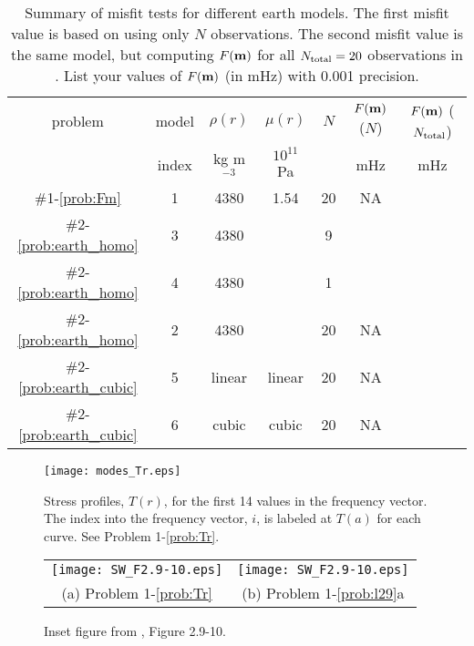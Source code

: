 \documentclass[11pt,titlepage,fleqn]{article}
\begin{document}
\begin{table}
\centering
\caption[]
{{
Summary of misfit tests for different earth models.
The first misfit value is based on using only $N$ observations.
The second misfit value is the same model, but computing $F(\mbox{${\bf m}$})$ for all $N_{\rm total}=20$ observations in .
List your values of $F(\mbox{${\bf m}$})$ (in mHz) with 0.001 precision.
\label{tab:homo}
}}
\begin{spacing}{1.5}
\begin{tabular}{||c|c|c|c|c|c||c|}
\hline
problem & model & $\rho(r)$ & $\mu(r)$ & $N$ & $F(\mbox{${\bf m}$})$ ($N$) & $F(\mbox{${\bf m}$})$ ($N_{\rm total}$) \\
& index & kg m$^{-3}$ & $10^{11}$ Pa & & mHz & mHz \\ \hline\hline
$\#$1-\ref{prob:Fm} & 1 & 4380 & 1.54 & 20 & NA &  \\  \hline
$\#$2-\ref{prob:earth_homo} & 3 & 4380 &      & 9  &  &  \\  \hline
$\#$2-\ref{prob:earth_homo} & 4 & 4380 &      & 1  &  &  \\  \hline
\hline
$\#$2-\ref{prob:earth_homo} & 2 & 4380 &      & 20 & NA  &  \\  \hline
$\#$2-\ref{prob:earth_cubic} & 5 & linear & linear & 20 & NA  & \\ \hline
$\#$2-\ref{prob:earth_cubic} & 6 & cubic & cubic & 20 & NA  & \\ \hline
\hline
\end{tabular}
\end{spacing}
\end{table}

\clearpage\pagebreak

\begin{figure}
\centering
\texttt{[image: modes\_Tr.eps]}
\caption[]
{{
Stress profiles, $T(r)$, for the first 14 values in the frequency vector.
The index into the frequency vector, $i$, is labeled at $T(a)$ for each curve.
See Problem 1-\ref{prob:Tr}.
\label{fig:Tr}
}}
\end{figure}

\begin{figure}
\hspace{-1cm}
\begin{tabular}{cc}
\texttt{[image: SW\_F2.9-10.eps]} &
\texttt{[image: SW\_F2.9-10.eps]} \\
(a) Problem 1-\ref{prob:Tr} & (b) Problem 1-\ref{prob:l29}a 
\end{tabular}
\caption[]
{{
Inset figure from \citet{SteinWysession}, Figure 2.9-10.
\label{fig:dots}
}}
\end{figure}

\end{document}
